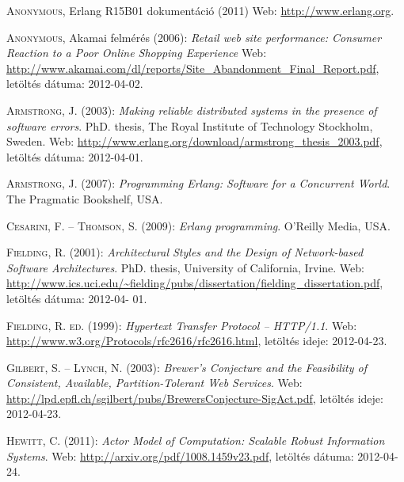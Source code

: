 \documentclass[12pt, a4paper, oneside]{book}
\begin{document}
\begin{thebibliography}{9}

{\scshape Anonymous}, Erlang R15B01 dokumentáció (2011) Web:
\url{http://www.erlang.org}.

{\scshape Anonymous}, Akamai felmérés (2006): \emph{Retail web site performance: Consumer Reaction to a Poor Online
Shopping Experience} Web:
\url{http://www.akamai.com/dl/reports/Site_Abandonment_Final_Report.pdf},
letöltés dátuma: 2012-04-02.

{\scshape Armstrong, J.} (2003): \emph{Making reliable distributed systems in the presence of software errors}. PhD.
thesis, The Royal Institute of Technology Stockholm, Sweden. Web:
\url{http://www.erlang.org/download/armstrong_thesis_2003.pdf}, letöltés
dátuma: 2012-04-01.

{\scshape Armstrong, J.} (2007): \emph{Programming Erlang: Software for a Concurrent World}. The Pragmatic
Bookshelf, USA.

{\scshape Cesarini, F. -- Thomson, S.} (2009): \emph{Erlang programming}.
O'Reilly Media, USA.

{\scshape Fielding, R.} (2001): \emph{Architectural Styles and the Design of Network-based Software
Architectures}. PhD. thesis, University of California, Irvine. Web:
\url{http://www.ics.uci.edu/~fielding/pubs/dissertation/fielding_dissertation.pdf}, letöltés dátuma: 2012-04-
01.

{\scshape Fielding, R. ed.} (1999): \emph{Hypertext Transfer Protocol --
HTTP/1.1}. Web: \url{http://www.w3.org/Protocols/rfc2616/rfc2616.html},
letöltés ideje: 2012-04-23.

{\scshape Gilbert, S. -- Lynch, N.} (2003): \emph{Brewer’s Conjecture and the
Feasibility of Consistent, Available, Partition-Tolerant Web Services}. Web:
\url{http://lpd.epfl.ch/sgilbert/pubs/BrewersConjecture-SigAct.pdf}, letöltés
ideje: 2012-04-23.

{\scshape Hewitt, C.} (2011): \emph{Actor Model of Computation: Scalable Robust
Information Systems}. Web: \url{http://arxiv.org/pdf/1008.1459v23.pdf},
letöltés dátuma: 2012-04-24.


\end{thebibliography}
\end{document}
